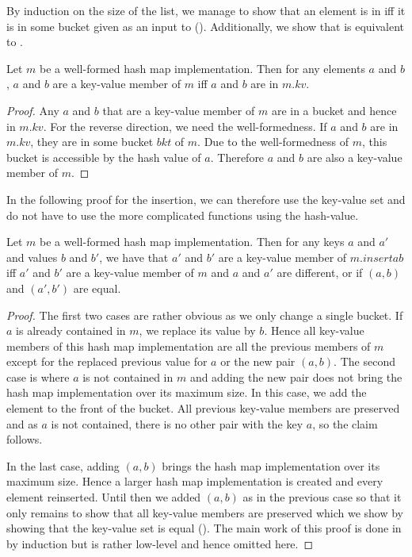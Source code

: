 By induction on the size of the list, we manage to show that an element is in \StdHashMapImpkv iff it is in some bucket given as an input to (\StdArrayfoldlunion). Additionally, we  
show that \StdHashMapImpkv is equivalent to \StdHashMapImpkvmember.

\begin{lemma}[\StdHashMapImpkvmemberiffinkv]
  Let $m$ be a well-formed hash map implementation. Then for any elements $a$ and $b$, $a$ and $b$ are a key-value member of $m$ iff $a$ and $b$ are in $m.kv$.
\end{lemma}
\begin{proof}
  Any $a$ and $b$ that are a key-value member of $m$ are in a bucket and hence in $m.kv$. For the reverse direction, we need the well-formedness. If $a$ and $b$ are in $m.kv$, they are in some bucket $bkt$ of $m$. Due to the well-formedness of $m$, this bucket is accessible by the hash value of $a$. Therefore $a$ and $b$ are also a key-value member of $m$.
\end{proof}

In the following proof for the insertion, we can therefore use the key-value set and do not have to use the more complicated functions using the hash-value.

\begin{lemma}[\StdHashMapImpinsertsemantics]
  Let $m$ be a well-formed hash map implementation. Then for any keys $a$ and $a'$ and values $b$ and $b'$, we have that $a'$ and $b'$ are a key-value member of $m.insert a b$ iff $a'$ and $b'$ are a key-value member of $m$ and $a$ and $a'$ are different, or if $(a,b)$ and $(a',b')$ are equal.
\end{lemma}
\begin{proof}
The first two cases are rather obvious as we only change a single bucket. If $a$ is already contained in $m$, we replace its value by $b$. Hence all key-value members of this hash map implementation are all the previous members of $m$ except for the replaced previous value for $a$ or the new pair $(a,b)$. The second case is where $a$ is not contained in $m$ and adding the new pair does not bring the hash map implementation over its maximum size. In this case, we add the element to the front of the bucket. All previous key-value members are preserved and as $a$ is not contained, there is no other pair with the key $a$, so the claim follows.

In the last case, adding $(a,b)$ brings the hash map implementation over its maximum size. Hence a larger hash map implementation is created and every element reinserted. Until then we added $(a,b)$ as in the previous case so that it only remains to show that all key-value members are preserved which we show by showing that the key-value set is equal (\StdHashMapImpexpandpreservesmem). The main work of this proof is done in \StdHashMapImpexpandgomem by induction but is rather low-level and hence omitted here.
\end{proof}

